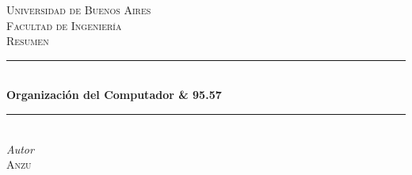 \documentclass[11pt]{article}
\begin{document}
\setcounter{secnumdepth}{5}

\begin{titlepage} 
	\newcommand{\HRule}{\rule{\linewidth}{0.5mm}}
	
	\center
	
	
	\textsc{\LARGE Universidad de Buenos Aires}\\[1.5cm]
	
	\textsc{\Large Facultad de Ingeniería}\\[0.5cm]
	
	\textsc{\large Resumen}\\[0.5cm]
	
	
	\HRule\\[0.4cm]
	
	{\huge\bfseries Organización del Computador  \& 95.57}\\[0.4cm] 
	
	\HRule\\[1.5cm]
	
	
	
	{\large\textit{Autor}}\\
	\textsc{Anzu} %
	

\end{titlepage}
\end{document}
